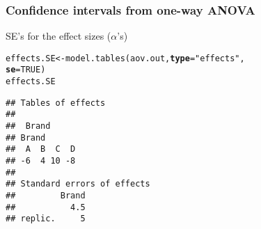 \documentclass[color=usenames,dvipsnames]{beamer}\usepackage[]{graphicx}\usepackage[]{color}
\makeatletter
\newcommand{\hlnum}[1]{\textcolor[rgb]{0.69,0.494,0}{#1}}%
\newcommand{\hlstr}[1]{\textcolor[rgb]{0.749,0.012,0.012}{#1}}%
\newcommand{\hlstd}[1]{\textcolor[rgb]{0,0,0}{#1}}%
\newcommand{\hlkwb}[1]{\textcolor[rgb]{0,0.341,0.682}{#1}}%
\newcommand{\hlkwc}[1]{\textcolor[rgb]{0,0,0}{\textbf{#1}}}%
\newcommand{\hlkwd}[1]{\textcolor[rgb]{0.004,0.004,0.506}{#1}}%
\newenvironment{kframe}{%
 \def\at@end@of@kframe{}%
 \ifinner\ifhmode%
  \def\at@end@of@kframe{\end{minipage}}%
  \begin{minipage}{\columnwidth}%
 \fi\fi%
 \def\FrameCommand##1{\hskip\@totalleftmargin \hskip-\fboxsep
 \colorbox{shadecolor}{##1}\hskip-\fboxsep
     \hskip-\linewidth \hskip-\@totalleftmargin \hskip\columnwidth}%
 \MakeFramed {\advance\hsize-\width
   \@totalleftmargin\z@ \linewidth\hsize
   \@setminipage}}%
 {\par\unskip\endMakeFramed%
 \at@end@of@kframe}
\newenvironment{knitrout}{}{} %
\makeatother
\begin{document}
\begin{frame}[fragile]
  \frametitle{Confidence intervals from one-way ANOVA}
  \small %
  {%
    SE's for the effect sizes ($\alpha$'s)}
\begin{knitrout}
\color{fgcolor}\begin{kframe}
\begin{alltt}
\hlstd{effects.SE} \hlkwb{<-} \hlkwd{model.tables}\hlstd{(aov.out,} \hlkwc{type}\hlstd{=}\hlstr{"effects"}\hlstd{,}
                           \hlkwc{se}\hlstd{=}\hlnum{TRUE}\hlstd{)}
\hlstd{effects.SE}
\end{alltt}
\begin{verbatim}
## Tables of effects
## 
##  Brand 
## Brand
##  A  B  C  D 
## -6  4 10 -8 
## 
## Standard errors of effects
##         Brand
##           4.5
## replic.     5
\end{verbatim}
\end{kframe}
\end{knitrout}
\end{frame}
\end{document}
